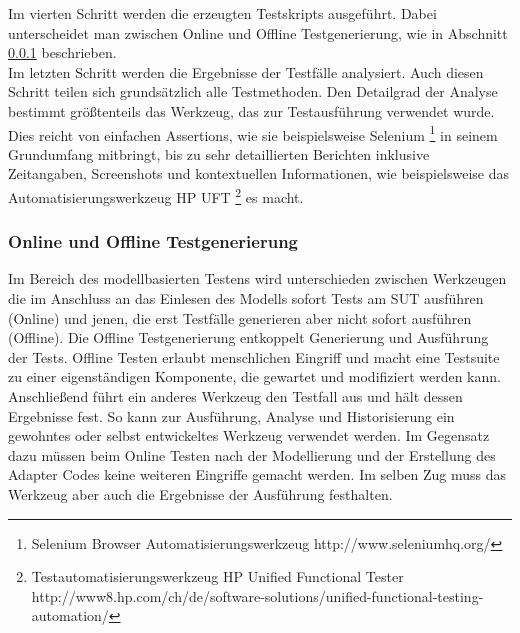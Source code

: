 Im vierten Schritt werden die erzeugten Testskripts ausgeführt. Dabei unterscheidet man zwischen Online und Offline Testgenerierung, wie in Abschnitt \ref{sec:online_offline} beschrieben.\\
Im letzten Schritt werden die Ergebnisse der Testfälle analysiert. Auch diesen Schritt teilen sich grundsätzlich alle Testmethoden. Den Detailgrad der Analyse bestimmt größtenteils das Werkzeug, das zur Testausführung verwendet wurde. Dies reicht von einfachen Assertions, wie sie beispielsweise Selenium \footnote{Selenium Browser Automatisierungswerkzeug http://www.seleniumhq.org/} in seinem Grundumfang mitbringt, bis zu sehr detaillierten Berichten inklusive Zeitangaben, Screenshots und kontextuellen Informationen, wie beispielsweise das Automatisierungswerkzeug HP UFT \footnote{Testautomatisierungswerkzeug HP Unified Functional Tester http://www8.hp.com/ch/de/software-solutions/unified-functional-testing-automation/} es macht.

\subsubsection{Online und Offline Testgenerierung}
\label{sec:online_offline}
Im Bereich des modellbasierten Testens wird unterschieden zwischen Werkzeugen die im Anschluss an das Einlesen des Modells sofort Tests am \ac{SUT} ausführen (Online) und jenen, die erst Testfälle generieren aber nicht sofort ausführen (Offline). Die Offline Testgenerierung entkoppelt Generierung und Ausführung der Tests. Offline Testen erlaubt menschlichen Eingriff und macht eine Testsuite zu einer eigenständigen Komponente, die gewartet und modifiziert werden kann. Anschließend führt ein anderes Werkzeug den Testfall aus und hält dessen Ergebnisse fest. So kann zur Ausführung, Analyse und Historisierung ein gewohntes oder selbst entwickeltes Werkzeug verwendet werden. Im Gegensatz dazu müssen beim Online Testen nach der Modellierung und der Erstellung des Adapter Codes keine weiteren Eingriffe gemacht werden. Im selben Zug muss das Werkzeug aber auch die Ergebnisse der Ausführung festhalten.


